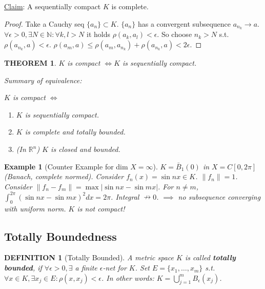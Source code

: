 \documentclass[12pt]{article}
\theoremstyle{blueplain}
\newtheorem{theorem}{THEOREM}[section]
\theoremstyle{bluedef}
\newtheorem{definition}{DEFINITION}[section]
\theoremstyle{blueremark}
\newtheorem{example}{Example}[section]
\newcommand{\R}{\mathbb{R}}
\newcommand{\N}{\mathbb{N}}
\numberwithin{equation}{section}
\begin{document}
      \underline{Claim}:
      A sequentially compact $K$ is complete.
      \begin{proof}
        Take a Cauchy seq $\{a_n\} \subset K$.
        $\{a_n\}$ has a convergent subsequence $a_{n_k} \to a$.
        $\forall \epsilon > 0, \exists N \in \N: \forall k, l > N$ it holds $\rho(a_k, a_l) < \epsilon$.
        So choose $n_k > N$ s.t. $\rho(a_{n_k}, a) < \epsilon$.
        $\rho(a_m, a) \leq \rho(a_m, a_{n_k}) + \rho(a_{n_k}, a) < 2\epsilon$.
      \end{proof}


      \begin{theorem}
        $K$ is compact $\iff K$ is sequentially compact.

        Summary of equivalence:

        $K$ is compact $\iff$
        \begin{enumerate}
          \item $K$ is sequentially compact.
          \item $K$ is complete and totally bounded.
          \item (In $\R^n$) $K$ is closed and bounded.
        \end{enumerate}
      \end{theorem}

      \begin{example}[Counter Example for dim $X = \infty$]
        $K = \bar{B}_1(0)$ in $X = C[0, 2\pi]$ (Banach, complete normed).
        Consider $f_n(x) = \sin nx \in K$. $\|f_n\| = 1$.
        Consider $\|f_n - f_m\| = \max | \sin nx - \sin mx |$.
        For $n \neq m$, $\int_0^{2\pi} (\sin nx - \sin mx)^2 dx = 2\pi$.
        Integral $\nrightarrow 0$.
        $\implies$ no subsequence converging with uniform norm.
        $K$ is not compact!
      \end{example}

      \clearpage

      \subsection{Totally Boundedness}

      \begin{definition}[Totally Bounded]
        A metric space $K$ is called \textbf{totally bounded}, if $\forall \epsilon > 0, \exists$ a finite $\epsilon$-net for $K$.
        Set $E = \{x_1, \ldots, x_m\}$ s.t. $\forall x \in K, \exists x_j \in E: \rho(x, x_j) < \epsilon$.
        In other words: $K = \bigcup_{j=1}^m B_\epsilon(x_j)$.
      \end{definition}
\end{document}
